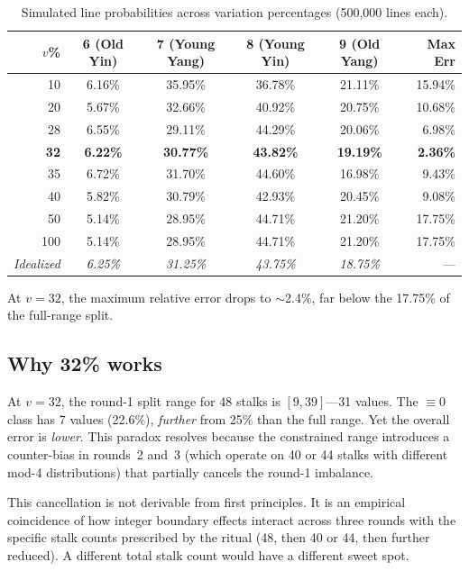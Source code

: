 \documentclass{article}
\begin{document}
\begin{table}[h]
\centering
\begin{tabular}{rccccr}
\toprule
$v$\% & 6 (Old Yin) & 7 (Young Yang) & 8 (Young Yin) & 9 (Old Yang) & Max Err \\
\midrule
10 & 6.16\% & 35.95\% & 36.78\% & 21.11\% & 15.94\% \\
20 & 5.67\% & 32.66\% & 40.92\% & 20.75\% & 10.68\% \\
28 & 6.55\% & 29.11\% & 44.29\% & 20.06\% & 6.98\% \\
\textbf{32} & \textbf{6.22\%} & \textbf{30.77\%} & \textbf{43.82\%} & \textbf{19.19\%} & \textbf{2.36\%} \\
35 & 6.72\% & 31.70\% & 44.60\% & 16.98\% & 9.43\% \\
40 & 5.82\% & 30.79\% & 42.93\% & 20.45\% & 9.08\% \\
50 & 5.14\% & 28.95\% & 44.71\% & 21.20\% & 17.75\% \\
100 & 5.14\% & 28.95\% & 44.71\% & 21.20\% & 17.75\% \\
\midrule
\textit{Idealized} & \textit{6.25\%} & \textit{31.25\%} & \textit{43.75\%} & \textit{18.75\%} & --- \\
\bottomrule
\end{tabular}
\caption{Simulated line probabilities across variation percentages (500{,}000 lines each).}
\label{tab:sweep}
\end{table}

At $v = 32$, the maximum relative error drops to $\sim$2.4\%, far below the 17.75\% of the full-range split.

\subsection{Why 32\% works}

At $v = 32$, the round-1 split range for 48 stalks is $[9, 39]$---31 values. The $\equiv 0$ class has 7 values (22.6\%), \textit{further} from 25\% than the full range. Yet the overall error is \textit{lower}. This paradox resolves because the constrained range introduces a counter-bias in rounds~2 and~3 (which operate on 40 or 44 stalks with different mod-4 distributions) that partially cancels the round-1 imbalance.

This cancellation is not derivable from first principles. It is an empirical coincidence of how integer boundary effects interact across three rounds with the specific stalk counts prescribed by the ritual (48, then 40 or 44, then further reduced). A different total stalk count would have a different sweet spot.
\end{document}
